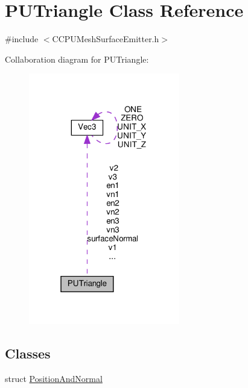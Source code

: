 \hypertarget{classPUTriangle}{}\section{P\+U\+Triangle Class Reference}
\label{classPUTriangle}


{\ttfamily \#include $<$C\+C\+P\+U\+Mesh\+Surface\+Emitter.\+h$>$}



Collaboration diagram for P\+U\+Triangle\+:
\nopagebreak
\begin{figure}[H]
\begin{center}
\leavevmode
\includegraphics[width=187pt]{classPUTriangle__coll__graph}
\end{center}
\end{figure}
\subsection*{Classes}
\begin{DoxyCompactItemize}
\item 
struct \hyperlink{structPUTriangle_1_1PositionAndNormal}{Position\+And\+Normal}
\end{DoxyCompactItemize}
